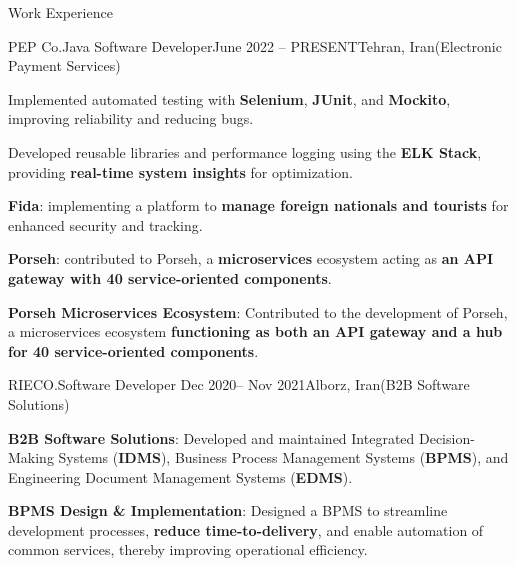\documentclass[]{kyvernitis-resume}
\begin{document}
\begin{section}{Work Experience}
\begin{subsection}{PEP Co.}{Java Software Developer}{June 2022 -- PRESENT}{Tehran, Iran}{(Electronic Payment Services)}
		\item Implemented automated testing with \textbf{Selenium}, \textbf{JUnit}, and \textbf{Mockito}, improving reliability and reducing bugs.

		\item Developed reusable libraries and performance logging using the \textbf{ELK Stack}, providing \textbf{real-time system insights} for optimization.

		\item \textbf{Fida}: implementing a platform to \textbf{manage foreign nationals and tourists} for enhanced security and tracking.
		\item \textbf{Porseh}: contributed to Porseh, a \textbf{microservices} ecosystem acting as \textbf{an API gateway with 40 service-oriented components}.
		\item \textbf{Porseh Microservices Ecosystem}: Contributed to the development of Porseh, a microservices ecosystem \textbf{functioning as both an API gateway and a hub for 40 service-oriented components}.
    \end{subsection}


 \begin{subsection}{RIECO.}{Software Developer }{Dec 2020-- Nov 2021}{Alborz, Iran}{(B2B Software Solutions)}
	
	\item \textbf{B2B Software Solutions}: Developed and maintained Integrated Decision-Making Systems (\textbf{IDMS}), Business Process Management Systems (\textbf{BPMS}), and Engineering Document Management Systems (\textbf{EDMS}).
	\item \textbf{BPMS Design \& Implementation}: Designed a BPMS to streamline development processes, \textbf{reduce time-to-delivery}, and enable automation of common services, thereby improving operational efficiency.
	

\end{subsection}
\end{section}
\end{document}
